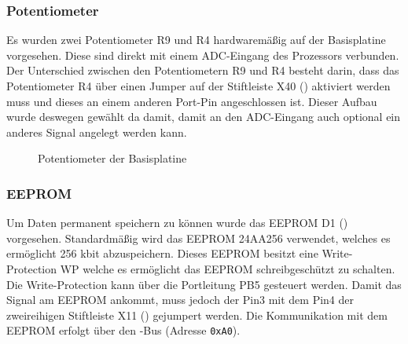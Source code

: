 \subsubsection{Potentiometer}
Es wurden zwei Potentiometer R9 und R4 hardwaremäßig auf der \gls{Basisplatine} vorgesehen. Diese sind direkt mit einem \gls{ADC}-Eingang des Prozessors verbunden. Der Unterschied zwischen den Potentiometern R9 und R4 besteht darin, dass das Potentiometer R4 über einen Jumper auf der Stiftleiste X40 () aktiviert werden muss und dieses an einem anderen Port-Pin angeschlossen ist. Dieser Aufbau wurde deswegen gewählt da damit, damit an den \gls{ADC}-Eingang auch optional ein anderes Signal angelegt werden kann.

\begin{figure}[H]
    \centering
    \qquad
    \qquad
    \qquad
    \caption[Potentiometer der Basisplatine]{Potentiometer der \gls{Basisplatine}}
    \label{fig:basisplatine-poti}
\end{figure}

\subsubsection{EEPROM}
Um Daten permanent speichern zu können wurde das EEPROM D1 () vorgesehen. Standardmäßig wird das EEPROM 24AA256 verwendet, welches es ermöglicht 256 kbit abzuspeichern. Dieses EEPROM besitzt eine Write-Protection WP welche es ermöglicht das EEPROM schreibgeschützt zu schalten. Die Write-Protection kann über die Portleitung PB5 gesteuert werden. Damit das Signal am EEPROM ankommt, muss jedoch der Pin3 mit dem Pin4 der zweireihigen Stiftleiste X11 () gejumpert werden. Die Kommunikation mit dem EEPROM erfolgt über den \IIC{}-Bus (Adresse \texttt{0xA0}).

